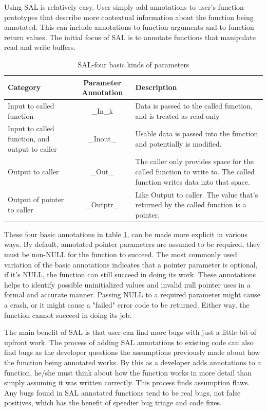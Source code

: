 Using SAL is relatively easy. User simply add annotations to user's function prototypes that describe more contextual information about the function being annotated. This can include annotations to function arguments and to function return values. The initial focus of SAL is to annotate functions that manipulate read and write buffers. 

\begin{table}
	\centering
	\begin{tabular}{|l|c|p{5cm}|}
		\hline
		Category  & Parameter Annotation & Description  \\
		\hline
		
		Input to called function        & \_In\_k  		   & Data is passed to the called function, and 
		is treated as read-only\\
		\hline
		
		Input to called function, and output to caller        & \_Inout\_ & Usable data is passed into the function 
		and potentially is modified. \\ \hline
		Output to caller        & \_Out\_ & The caller only provides space 
		for the called function to write to. 
		The called function writes
		data into that space. \\
		\hline
		
		Output of pointer to caller         & \_Outptr\_  & Like Output to caller. The value that's returned by the called function is a pointer.\\ 	\hline
			
	\end{tabular}
	\caption{SAL-four basic kinds of parameters}
	\label{table:four basic kinds of parameters}
\end{table}

These four basic annotations in table \ref{table:four basic kinds of parameters}, can be made more explicit in various ways. By default, annotated pointer parameters are assumed to be required, they must be non-NULL for the function to succeed. The most commonly used variation of the basic annotations indicates that a pointer parameter is optional, if it's NULL, the function can still succeed in doing its work. These annotations helps to identify possible uninitialized values and invalid null pointer uses in a formal and accurate manner. Passing NULL to a required parameter might cause a crash, or it might cause a "failed" error code to be returned. Either way, the function cannot succeed in doing its job.

The main benefit of SAL is that user can find more bugs with just a little bit of upfront work. The process of adding SAL annotations to existing code can also find bugs as the developer questions the assumptions previously made about how the function being annotated works. By this as a developer adds annotations to a function, he/she must think about how the function works in more detail than simply assuming it was written correctly. This process finds assumption flaws. Any bugs found in SAL annotated functions tend to be real bugs, not false positives, which has the benefit of speedier bug triage and code fixes.

